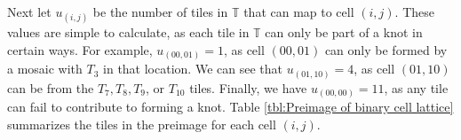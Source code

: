 \documentclass[12pt]{article}
\theoremstyle{plain}
\theoremstyle{definition}
\theoremstyle{remark}
\theoremstyle{definition}
\newcommand{\lablnode}[3]{\node[shape=circle,draw=none,fill=none, inner sep=0pt,minimum size=0pt] (A) at ( #1 , #2 ) {#3};}
\newcommand{\lablvertex}[3]{\node[shape=circle,draw=none,fill=white, inner sep=2pt,minimum size=5pt] (A) at ( #1 , #2 ) {#3};}
\begin{document}
\begin{center}
\end{center}

Next let $u_{(i,j)}$ be the number of tiles in $\mathbb{T}$ that can map to cell $(i,j)$. These values are simple to calculate, as each tile in $\mathbb{T}$ can only be part of a knot in certain ways. For example, $u_{(00, 01)} = 1$, as cell $(00,01)$ can only be formed by a mosaic with $T_3$ in that location. We can see that $u_{(01,10)}=4$, as cell $(01,10)$ can be from the $T_7,T_8,T_9$, or $T_{10}$ tiles. Finally, we have $u_{(00,00)}=11$, as any tile can fail to contribute to forming a knot. Table \ref{tbl:Preimage of binary cell lattice} summarizes the tiles in the preimage for each cell $(i,j)$. 
\end{document}
